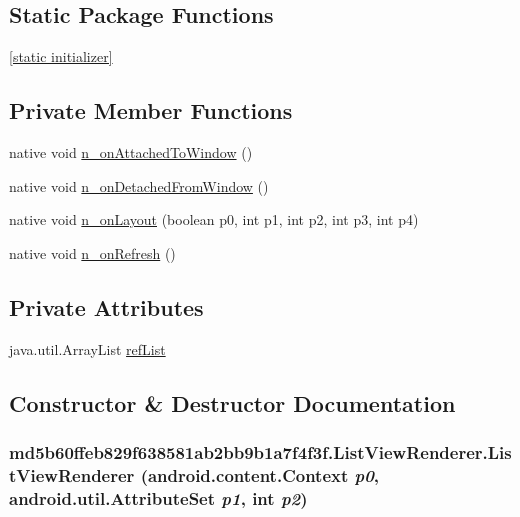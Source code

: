 \subsection*{Static Package Functions}
\begin{CompactItemize}
\item 
\hyperlink{classmd5b60ffeb829f638581ab2bb9b1a7f4f3f_1_1_list_view_renderer_6ddb2c083c756eaa0488ea0b72527ab4}{\mbox{[}static initializer\mbox{]}}
\end{CompactItemize}
\subsection*{Private Member Functions}
\begin{CompactItemize}
\item 
native void \hyperlink{classmd5b60ffeb829f638581ab2bb9b1a7f4f3f_1_1_list_view_renderer_f1303a48df3b1f7253b9500e2614e515}{n\_\-onAttachedToWindow} ()
\item 
native void \hyperlink{classmd5b60ffeb829f638581ab2bb9b1a7f4f3f_1_1_list_view_renderer_526706bd1d93c3ab40c34c2a93640b94}{n\_\-onDetachedFromWindow} ()
\item 
native void \hyperlink{classmd5b60ffeb829f638581ab2bb9b1a7f4f3f_1_1_list_view_renderer_88db0ee991444107111a9da6f510dfc5}{n\_\-onLayout} (boolean p0, int p1, int p2, int p3, int p4)
\item 
native void \hyperlink{classmd5b60ffeb829f638581ab2bb9b1a7f4f3f_1_1_list_view_renderer_1d4e5a793321e64baef8753338b9feea}{n\_\-onRefresh} ()
\end{CompactItemize}
\subsection*{Private Attributes}
\begin{CompactItemize}
\item 
java.util.ArrayList \hyperlink{classmd5b60ffeb829f638581ab2bb9b1a7f4f3f_1_1_list_view_renderer_38328e716caa471f08bce0fc4af554aa}{refList}
\end{CompactItemize}


\subsection{Constructor \& Destructor Documentation}
\hypertarget{classmd5b60ffeb829f638581ab2bb9b1a7f4f3f_1_1_list_view_renderer_dd061c8b593d05e8c08a3b32390f1693}{
\subsubsection[{ListViewRenderer}]{\setlength{\rightskip}{0pt plus 5cm}md5b60ffeb829f638581ab2bb9b1a7f4f3f.ListViewRenderer.ListViewRenderer (android.content.Context {\em p0}, \/  android.util.AttributeSet {\em p1}, \/  int {\em p2})}}
\label{classmd5b60ffeb829f638581ab2bb9b1a7f4f3f_1_1_list_view_renderer_dd061c8b593d05e8c08a3b32390f1693}


